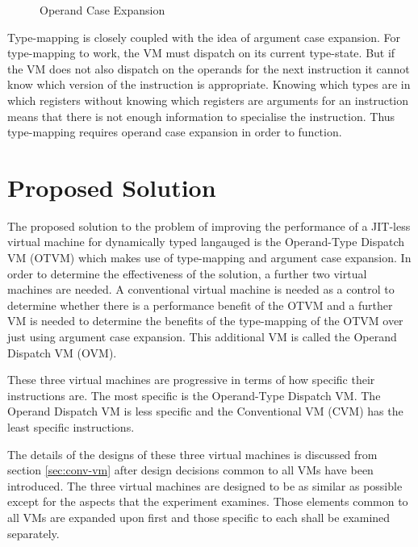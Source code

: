\documentclass[english,a4paper,12pt]{report}
\begin{document}
\begin{figure}[!htb]
	\centering
	\caption{Operand Case Expansion}
	\label{fig:op-case-expansion}
	
\end{figure}

Type-mapping is closely coupled with the idea of argument case
expansion. For type-mapping to work, the VM must dispatch on its
current type-state. But if the VM does not also dispatch on the
operands for the next instruction it cannot know which version of the
instruction is appropriate. Knowing which types are in which registers
without knowing which registers are arguments for an instruction means
that there is not enough information to specialise the
instruction. Thus type-mapping requires operand case expansion in
order to function.

\section{Proposed Solution}
The proposed solution to the problem of improving the performance of a
JIT-less virtual machine for dynamically typed langauged is the
Operand-Type Dispatch VM (OTVM) which makes use of type-mapping and
argument case expansion. In order to determine the effectiveness of
the solution, a further two virtual machines are needed. A
conventional virtual machine is needed as a control to determine
whether there is a performance benefit of the OTVM and a further VM is
needed to determine the benefits of the type-mapping of the OTVM over
just using argument case expansion. This additional VM is called the
Operand Dispatch VM (OVM).

These three virtual machines are progressive in terms of how specific
their instructions are. The most specific is the Operand-Type Dispatch
VM.  The Operand Dispatch VM is less specific and the Conventional VM
(CVM) has the least specific instructions.

The details of the designs of these three virtual machines is
discussed from section \ref{sec:conv-vm} after design decisions common
to all VMs have been introduced. The three virtual machines are
designed to be as similar as possible except for the aspects that the
experiment examines. Those elements common to all VMs are expanded
upon first and those specific to each shall be examined separately.
\end{document}
